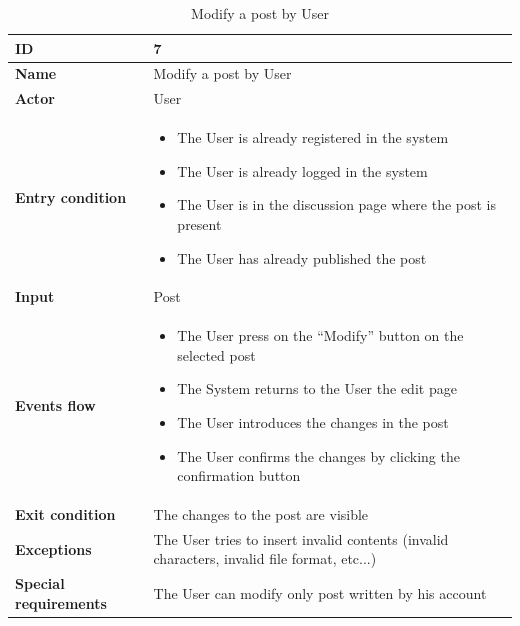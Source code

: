     \begin{longtable}{p{} | p{}}
    \caption{Modify a post by User}
        \label{tab:modify_post_by_user}\\
        \hline
        \textbf{ID} & 7\\
        \hline
        \textbf{Name}  &  Modify a post by User\\
        \hline
        \textbf{Actor}  &  User\\
        \hline
        \textbf{Entry condition}  &  
        \begin{itemize}
                \item The User is already registered in the system
                \item The User is already logged in the system
                \item The User is in the discussion page where the post is present
                \item The User has already published the post
         \end{itemize}\\
        \hline
        \textbf{Input} & Post\\
        \hline
        \textbf{Events flow} & 
        \begin{itemize}
                \item The User press on the “Modify” button on the selected post
                \item The System returns to the User the edit page
                \item The User introduces the changes in the post
                \item The User confirms the changes by clicking the confirmation button

                 \end{itemize}
                 \\
        \hline
        \textbf{Exit condition} & The changes to the post are visible\\
        \hline
        \textbf{Exceptions} &  The User  tries to insert invalid contents (invalid characters, invalid file format, etc...)\\
        \hline
        \textbf{Special requirements} & The User can modify only post written by his account \\ \hline
        
    \end{longtable}
